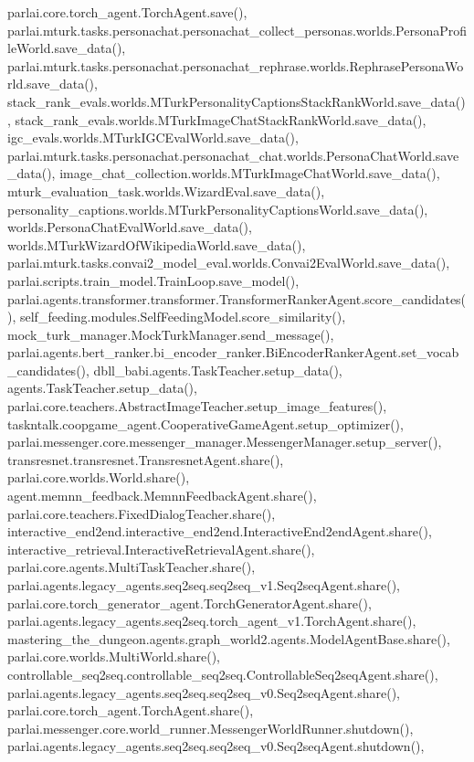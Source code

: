 parlai.\+core.\+torch\+\_\+agent.\+Torch\+Agent.\+save(), parlai.\+mturk.\+tasks.\+personachat.\+personachat\+\_\+collect\+\_\+personas.\+worlds.\+Persona\+Profile\+World.\+save\+\_\+data(), parlai.\+mturk.\+tasks.\+personachat.\+personachat\+\_\+rephrase.\+worlds.\+Rephrase\+Persona\+World.\+save\+\_\+data(), stack\+\_\+rank\+\_\+evals.\+worlds.\+M\+Turk\+Personality\+Captions\+Stack\+Rank\+World.\+save\+\_\+data(), stack\+\_\+rank\+\_\+evals.\+worlds.\+M\+Turk\+Image\+Chat\+Stack\+Rank\+World.\+save\+\_\+data(), igc\+\_\+evals.\+worlds.\+M\+Turk\+I\+G\+C\+Eval\+World.\+save\+\_\+data(), parlai.\+mturk.\+tasks.\+personachat.\+personachat\+\_\+chat.\+worlds.\+Persona\+Chat\+World.\+save\+\_\+data(), image\+\_\+chat\+\_\+collection.\+worlds.\+M\+Turk\+Image\+Chat\+World.\+save\+\_\+data(), mturk\+\_\+evaluation\+\_\+task.\+worlds.\+Wizard\+Eval.\+save\+\_\+data(), personality\+\_\+captions.\+worlds.\+M\+Turk\+Personality\+Captions\+World.\+save\+\_\+data(), worlds.\+Persona\+Chat\+Eval\+World.\+save\+\_\+data(), worlds.\+M\+Turk\+Wizard\+Of\+Wikipedia\+World.\+save\+\_\+data(), parlai.\+mturk.\+tasks.\+convai2\+\_\+model\+\_\+eval.\+worlds.\+Convai2\+Eval\+World.\+save\+\_\+data(), parlai.\+scripts.\+train\+\_\+model.\+Train\+Loop.\+save\+\_\+model(), parlai.\+agents.\+transformer.\+transformer.\+Transformer\+Ranker\+Agent.\+score\+\_\+candidates(), self\+\_\+feeding.\+modules.\+Self\+Feeding\+Model.\+score\+\_\+similarity(), mock\+\_\+turk\+\_\+manager.\+Mock\+Turk\+Manager.\+send\+\_\+message(), parlai.\+agents.\+bert\+\_\+ranker.\+bi\+\_\+encoder\+\_\+ranker.\+Bi\+Encoder\+Ranker\+Agent.\+set\+\_\+vocab\+\_\+candidates(), dbll\+\_\+babi.\+agents.\+Task\+Teacher.\+setup\+\_\+data(), agents.\+Task\+Teacher.\+setup\+\_\+data(), parlai.\+core.\+teachers.\+Abstract\+Image\+Teacher.\+setup\+\_\+image\+\_\+features(), taskntalk.\+coopgame\+\_\+agent.\+Cooperative\+Game\+Agent.\+setup\+\_\+optimizer(), parlai.\+messenger.\+core.\+messenger\+\_\+manager.\+Messenger\+Manager.\+setup\+\_\+server(), transresnet.\+transresnet.\+Transresnet\+Agent.\+share(), parlai.\+core.\+worlds.\+World.\+share(), agent.\+memnn\+\_\+feedback.\+Memnn\+Feedback\+Agent.\+share(), parlai.\+core.\+teachers.\+Fixed\+Dialog\+Teacher.\+share(), interactive\+\_\+end2end.\+interactive\+\_\+end2end.\+Interactive\+End2end\+Agent.\+share(), interactive\+\_\+retrieval.\+Interactive\+Retrieval\+Agent.\+share(), parlai.\+core.\+agents.\+Multi\+Task\+Teacher.\+share(), parlai.\+agents.\+legacy\+\_\+agents.\+seq2seq.\+seq2seq\+\_\+v1.\+Seq2seq\+Agent.\+share(), parlai.\+core.\+torch\+\_\+generator\+\_\+agent.\+Torch\+Generator\+Agent.\+share(), parlai.\+agents.\+legacy\+\_\+agents.\+seq2seq.\+torch\+\_\+agent\+\_\+v1.\+Torch\+Agent.\+share(), mastering\+\_\+the\+\_\+dungeon.\+agents.\+graph\+\_\+world2.\+agents.\+Model\+Agent\+Base.\+share(), parlai.\+core.\+worlds.\+Multi\+World.\+share(), controllable\+\_\+seq2seq.\+controllable\+\_\+seq2seq.\+Controllable\+Seq2seq\+Agent.\+share(), parlai.\+agents.\+legacy\+\_\+agents.\+seq2seq.\+seq2seq\+\_\+v0.\+Seq2seq\+Agent.\+share(), parlai.\+core.\+torch\+\_\+agent.\+Torch\+Agent.\+share(), parlai.\+messenger.\+core.\+world\+\_\+runner.\+Messenger\+World\+Runner.\+shutdown(), parlai.\+agents.\+legacy\+\_\+agents.\+seq2seq.\+seq2seq\+\_\+v0.\+Seq2seq\+Agent.\+shutdown(), 